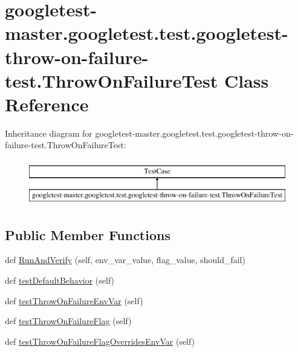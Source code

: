 \hypertarget{classgoogletest-master_1_1googletest_1_1test_1_1googletest-throw-on-failure-test_1_1_throw_on_failure_test}{}\section{googletest-\/master.googletest.\+test.\+googletest-\/throw-\/on-\/failure-\/test.Throw\+On\+Failure\+Test Class Reference}
\label{classgoogletest-master_1_1googletest_1_1test_1_1googletest-throw-on-failure-test_1_1_throw_on_failure_test}
Inheritance diagram for googletest-\/master.googletest.\+test.\+googletest-\/throw-\/on-\/failure-\/test.Throw\+On\+Failure\+Test\+:\begin{figure}[H]
\begin{center}
\leavevmode
\includegraphics[height=2.000000cm]{de/d96/classgoogletest-master_1_1googletest_1_1test_1_1googletest-throw-on-failure-test_1_1_throw_on_failure_test}
\end{center}
\end{figure}
\subsection*{Public Member Functions}
\begin{DoxyCompactItemize}
\item 
def \mbox{\hyperlink{classgoogletest-master_1_1googletest_1_1test_1_1googletest-throw-on-failure-test_1_1_throw_on_failure_test_a7b634aeb7a43dcf6e7dc1378911c6f80}{Run\+And\+Verify}} (self, env\+\_\+var\+\_\+value, flag\+\_\+value, should\+\_\+fail)
\item 
def \mbox{\hyperlink{classgoogletest-master_1_1googletest_1_1test_1_1googletest-throw-on-failure-test_1_1_throw_on_failure_test_a4df828da38cbd6834643d4d7c423fc91}{test\+Default\+Behavior}} (self)
\item 
def \mbox{\hyperlink{classgoogletest-master_1_1googletest_1_1test_1_1googletest-throw-on-failure-test_1_1_throw_on_failure_test_a6b0f25c900ff20fd41e3d025def5aca3}{test\+Throw\+On\+Failure\+Env\+Var}} (self)
\item 
def \mbox{\hyperlink{classgoogletest-master_1_1googletest_1_1test_1_1googletest-throw-on-failure-test_1_1_throw_on_failure_test_aa702965374926923b7a075801eb7e0e0}{test\+Throw\+On\+Failure\+Flag}} (self)
\item 
def \mbox{\hyperlink{classgoogletest-master_1_1googletest_1_1test_1_1googletest-throw-on-failure-test_1_1_throw_on_failure_test_a48f836b124ff22db9e5ed9df1e8bbe0d}{test\+Throw\+On\+Failure\+Flag\+Overrides\+Env\+Var}} (self)
\end{DoxyCompactItemize}


